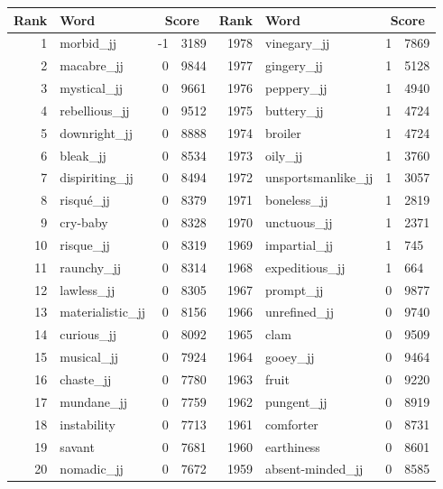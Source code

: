 \begin{table}[tbp]
    \begin{tabular}{| rlr@{.}l | rlr@{.}l |}
    \hline
    \textbf{Rank} & \textbf{Word} & \multicolumn{2}{c|}{\textbf{Score}} & \textbf{Rank} & \textbf{Word} & \multicolumn{2}{c|}{\textbf{Score}} \\
    \hline
    1 & morbid\_jj & -1 & 3189    &    1978 & vinegary\_jj & 1 & 7869 \\
    2 & macabre\_jj & 0 & 9844    &    1977 & gingery\_jj & 1 & 5128 \\
    3 & mystical\_jj & 0 & 9661    &    1976 & peppery\_jj & 1 & 4940 \\
    4 & rebellious\_jj & 0 & 9512    &    1975 & buttery\_jj & 1 & 4724 \\
    5 & downright\_jj & 0 & 8888    &    1974 & broiler & 1 & 4724 \\
    6 & bleak\_jj & 0 & 8534    &    1973 & oily\_jj & 1 & 3760 \\
    7 & dispiriting\_jj & 0 & 8494    &    1972 & unsportsmanlike\_jj & 1 & 3057 \\
    8 & risqué\_jj & 0 & 8379    &    1971 & boneless\_jj & 1 & 2819 \\
    9 & cry-baby & 0 & 8328    &    1970 & unctuous\_jj & 1 & 2371 \\
    10 & risque\_jj & 0 & 8319    &    1969 & impartial\_jj & 1 & 745 \\
    11 & raunchy\_jj & 0 & 8314    &    1968 & expeditious\_jj & 1 & 664 \\
    12 & lawless\_jj & 0 & 8305    &    1967 & prompt\_jj & 0 & 9877 \\
    13 & materialistic\_jj & 0 & 8156    &    1966 & unrefined\_jj & 0 & 9740 \\
    14 & curious\_jj & 0 & 8092    &    1965 & clam & 0 & 9509 \\
    15 & musical\_jj & 0 & 7924    &    1964 & gooey\_jj & 0 & 9464 \\
    16 & chaste\_jj & 0 & 7780    &    1963 & fruit & 0 & 9220 \\
    17 & mundane\_jj & 0 & 7759    &    1962 & pungent\_jj & 0 & 8919 \\
    18 & instability & 0 & 7713    &    1961 & comforter & 0 & 8731 \\
    19 & savant & 0 & 7681    &    1960 & earthiness & 0 & 8601 \\
    20 & nomadic\_jj & 0 & 7672    &    1959 & absent-minded\_jj & 0 & 8585 \\

\end{tabular}
\end{table}
